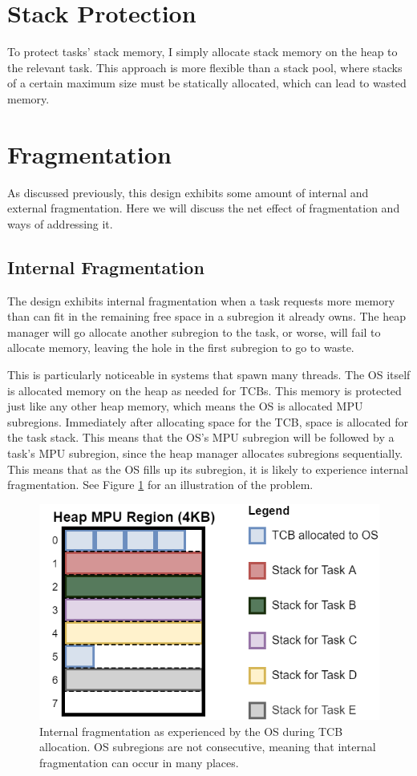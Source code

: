 \section{Stack Protection}

To protect tasks' stack memory, I simply allocate stack memory on the heap to the relevant task. This approach is more flexible than a stack pool, where stacks of a certain maximum size must be statically allocated, which can lead to wasted memory.

\section{Fragmentation}

As discussed previously, this design exhibits some amount of internal and external fragmentation.
Here we will discuss the net effect of fragmentation and ways of addressing it.

\subsection{Internal Fragmentation}

The design exhibits internal fragmentation when a task requests more memory than can fit in the remaining free space in a subregion it already owns. The heap manager will go allocate another subregion to the task, or worse, will fail to allocate memory, leaving the hole in the first subregion to go to waste.

This is particularly noticeable in systems that spawn many threads. The OS itself is allocated memory on the heap as needed for TCBs. This memory is protected just like any other heap memory, which means the OS is allocated MPU subregions. Immediately after allocating space for the TCB, space is allocated for the task stack. This means that the OS's MPU subregion will be followed by a task's MPU subregion, since the heap manager allocates subregions sequentially. This means that as the OS fills up its subregion, it is likely to experience internal fragmentation. See Figure \ref{fig:internal_frag} for an illustration of the problem.

\begin{figure}[hbtp]
	\centering
	\includegraphics[width=0.7\linewidth]{figs/OS_int_frag.png}
	\caption{Internal fragmentation as experienced by the OS during TCB allocation. OS subregions are not consecutive, meaning that internal fragmentation can occur in many places.}
	\label{fig:internal_frag}
\end{figure}

